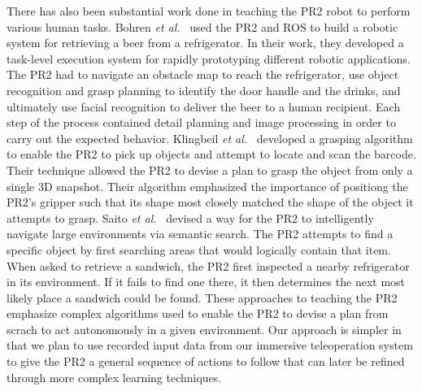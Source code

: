 \documentclass{sig-alternate}
\begin{document}
\indent There has also been substantial work done in teaching the PR2 robot to perform various human tasks. Bohren \textit{et al.}~\cite{beer} used the PR2 and ROS to build a robotic system for retrieving a beer from a refrigerator. In their work, they developed a task-level execution system for rapidly prototyping different robotic applications. The PR2 had to navigate an obstacle map to reach the refrigerator, use object recognition and grasp planning to identify the door handle and the drinks, and ultimately use facial recognition to deliver the beer to a human recipient. Each step of the process contained detail planning and image processing in order to carry out the expected behavior. Klingbeil \textit{et al.}~\cite{groceries} developed a grasping algorithm to enable the PR2 to pick up objects and attempt to locate and scan the barcode. Their technique allowed the PR2 to devise a plan to grasp the object from only a single 3D snapshot. Their algorithm emphasized the importance of positiong the PR2's gripper such that its shape most closely matched the shape of the object it attempts to grasp. Saito \textit{et al.}~\cite{subway} devised a way for the PR2 to intelligently navigate large environments via semantic search. The PR2 attempts to find a specific object by first searching areas that would logically contain that item. When asked to retrieve a sandwich, the PR2 first inspected a nearby refrigerator in its environment. If it fails to find one there, it then determines the next most likely place a sandwich could be found. These approaches to teaching the PR2 emphasize complex algorithms used to enable the PR2 to devise a plan from scrach to act autonomously in a given environment. Our approach is simpler in that we plan to use recorded input data from our immersive teleoperation system to give the PR2 a general sequence of actions to follow that can later be refined through more complex learning techniques.\\ 
\end{document}
